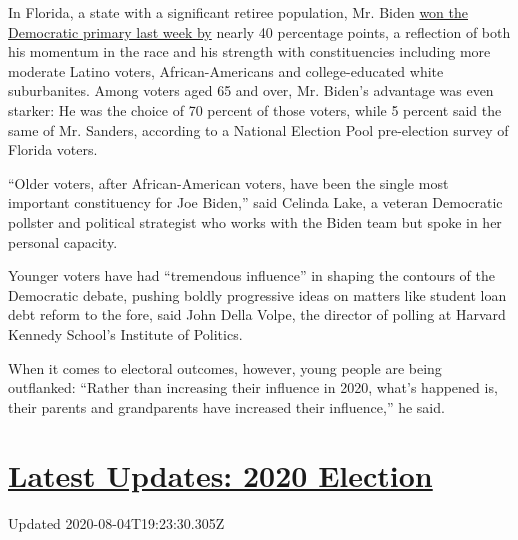 In Florida, a state with a significant retiree population, Mr. Biden
\href{https://www.nytimes.com/interactive/2020/03/17/us/elections/results-florida-president-democrat-primary-election.html}{won
the Democratic primary last week by} nearly 40 percentage points, a
reflection of both his momentum in the race and his strength with
constituencies including more moderate Latino voters, African-Americans
and college-educated white suburbanites. Among voters aged 65 and over,
Mr. Biden's advantage was even starker: He was the choice of 70 percent
of those voters, while 5 percent said the same of Mr. Sanders, according
to a National Election Pool pre-election survey of Florida voters.

``Older voters, after African-American voters, have been the single most
important constituency for Joe Biden,'' said Celinda Lake, a veteran
Democratic pollster and political strategist who works with the Biden
team but spoke in her personal capacity.

Younger voters have had ``tremendous influence'' in shaping the contours
of the Democratic debate, pushing boldly progressive ideas on matters
like student loan debt reform to the fore, said John Della Volpe, the
director of polling at Harvard Kennedy School's Institute of Politics.

When it comes to electoral outcomes, however, young people are being
outflanked: ``Rather than increasing their influence in 2020, what's
happened is, their parents and grandparents have increased their
influence,'' he said.

\hypertarget{latest-updates-2020-election}{%
\section{\texorpdfstring{\href{https://www.nytimes.com/2020/08/04/us/elections/primary-election-michigan-arizona-kansas.html?action=click\&pgtype=Article\&state=default\&region=MAIN_CONTENT_1\&context=storylines_live_updates}{Latest
Updates: 2020
Election}}{Latest Updates: 2020 Election}}\label{latest-updates-2020-election}}

Updated 2020-08-04T19:23:30.305Z

